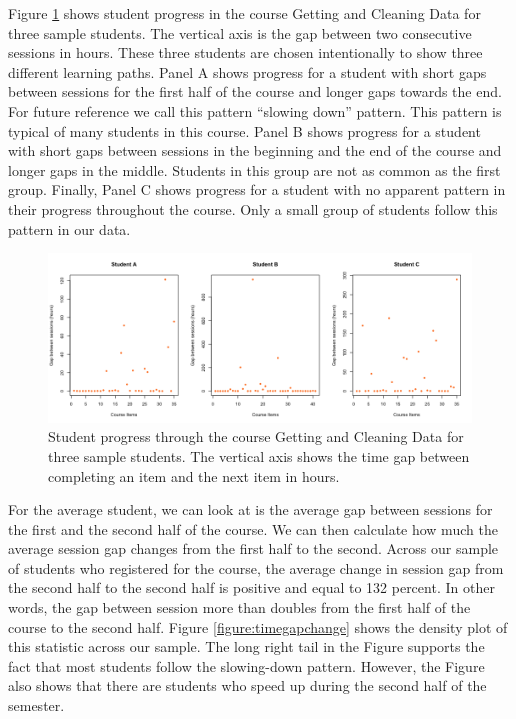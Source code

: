 Figure \ref{figure:sampleprogress} shows student progress in the course
Getting and Cleaning Data for three sample students. The vertical axis
is the gap between two consecutive sessions in hours. These three
students are chosen intentionally to show three different learning
paths. Panel A shows progress for a student with short gaps between
sessions for the first half of the course and longer gaps towards the
end. For future reference we call this pattern ``slowing down'' pattern.
This pattern is typical of many students in this course. Panel B shows
progress for a student with short gaps between sessions in the beginning
and the end of the course and longer gaps in the middle. Students in
this group are not as common as the first group. Finally, Panel C shows
progress for a student with no apparent pattern in their progress
throughout the course. Only a small group of students follow this
pattern in our data.

\begin{figure}[htbp] 
    \centering
    \includegraphics[scale=0.4]{sampleprogress}
    \caption{Student progress through the course Getting and Cleaning Data for three sample students. The vertical axis shows the time gap between completing an item and the next item in hours.}
    \label{figure:sampleprogress}
\end{figure}

For the average student, we can look at is the average gap between
sessions for the first and the second half of the course. We can then
calculate how much the average session gap changes from the first half
to the second. Across our sample of students who registered for the
course, the average change in session gap from the second half to the
second half is positive and equal to 132 percent. In other words, the
gap between session more than doubles from the first half of the course
to the second half. Figure \ref{figure:timegapchange} shows the density
plot of this statistic across our sample. The long right tail in the
Figure supports the fact that most students follow the slowing-down
pattern. However, the Figure also shows that there are students who
speed up during the second half of the semester.

